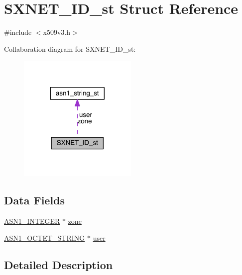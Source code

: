 \hypertarget{struct_s_x_n_e_t___i_d__st}{}\section{S\+X\+N\+E\+T\+\_\+\+I\+D\+\_\+st Struct Reference}
\label{struct_s_x_n_e_t___i_d__st}


{\ttfamily \#include $<$x509v3.\+h$>$}



Collaboration diagram for S\+X\+N\+E\+T\+\_\+\+I\+D\+\_\+st\+:\nopagebreak
\begin{figure}[H]
\begin{center}
\leavevmode
\includegraphics[width=161pt]{struct_s_x_n_e_t___i_d__st__coll__graph}
\end{center}
\end{figure}
\subsection*{Data Fields}
\begin{DoxyCompactItemize}
\item 
\hyperlink{crypto_2ossl__typ_8h_af4335399bf9774cb410a5e93de65998b}{A\+S\+N1\+\_\+\+I\+N\+T\+E\+G\+ER} $\ast$ \hyperlink{struct_s_x_n_e_t___i_d__st_a27f63fdf18e6ccb9491adcf718f33e0c}{zone}
\item 
\hyperlink{crypto_2ossl__typ_8h_afbd05e94e0f0430a2b729473efec88c1}{A\+S\+N1\+\_\+\+O\+C\+T\+E\+T\+\_\+\+S\+T\+R\+I\+NG} $\ast$ \hyperlink{struct_s_x_n_e_t___i_d__st_ad9d47f546cb406448dad26c528f77c3e}{user}
\end{DoxyCompactItemize}


\subsection{Detailed Description}


